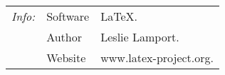 \documentclass{article}
\begin{document}
\begin{tabular}{@{}>{\itshape}ll!{:}l<{.}@{}}
  \hline
  Info:     & Software & \LaTeX\\
            & Author   & Leslie Lamport\\
            & Website  & www.latex-project.org\\
  \hline
\end{tabular}
\end{document}
